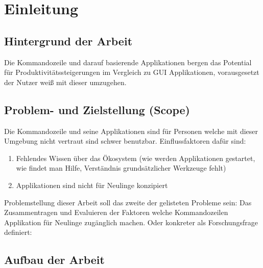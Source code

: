 \documentclass[oneside,bibliography=totocnumbered,BCOR=5mm]{scrbook}
\begin{document}
\chapter{Einleitung}
\section{Hintergrund der Arbeit}


Die Kommandozeile und darauf basierende Applikationen bergen das Potential für Produktivitätssteigerungen im Vergleich zu GUI Applikationen, vorausgesetzt der Nutzer weiß mit dieser umzugehen. %

\section{Problem- und Zielstellung (Scope)}


Die Kommandozeile und seine Applikationen sind für Personen welche mit dieser Umgebung nicht vertraut sind schwer benutzbar. %
Einflussfaktoren dafür sind:

\begin{enumerate}
  \item Fehlendes Wissen über das Ökosystem (wie werden Applikationen gestartet, wie findet man Hilfe, Verständnis grundsätzlicher Werkzeuge fehlt)
  \item Applikationen sind nicht für Neulinge konzipiert
\end{enumerate}

Problemstellung dieser Arbeit soll das zweite der gelisteten Probleme sein: Das Zusammentragen und Evaluieren der Faktoren welche Kommandozeilen Applikation für Neulinge zugänglich machen. Oder konkreter als Forschungsfrage definiert:

\bigbreak


\section{Aufbau der Arbeit}
\end{document}
